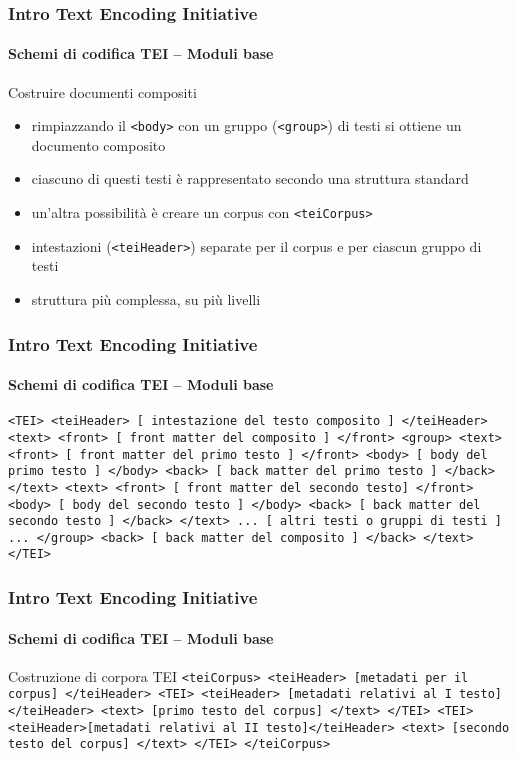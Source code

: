 \begin{frame}
	\frametitle{Intro Text Encoding Initiative}
	\framesubtitle{Schemi di codifica TEI – Moduli base}
	\addtocounter{nframe}{1}
    \begin{block}{Costruire documenti compositi}
        \begin{itemize}
            \item rimpiazzando il \texttt{<body>} con un gruppo (\texttt{<group>}) di testi si ottiene un documento composito
            \item ciascuno di questi testi è rappresentato secondo una struttura
            standard
            \item un’altra possibilità è creare un corpus con \texttt{<teiCorpus>}
            \item intestazioni (\texttt{<teiHeader>}) separate per il corpus e per
            ciascun gruppo di testi
            \item struttura più complessa, su più livelli
        \end{itemize}
    \end{block}
\end{frame}


\begin{frame}
	\frametitle{Intro Text Encoding Initiative}
	\framesubtitle{Schemi di codifica TEI – Moduli base}
	\addtocounter{nframe}{1}

        \texttt{<TEI>
        <teiHeader> [ intestazione del testo composito ] </teiHeader>
        <text>
        <front> [ front matter del composito ] </front>
        <group>
        <text>
        <front> [ front matter del primo testo ] </front>
        <body> [ body del primo testo ]
        </body>
        <back> [ back matter del primo testo ] </back>
        </text>
        <text>
        <front> [ front matter del secondo testo] </front>
        <body> [ body del secondo testo ]
        </body>
        <back> [ back matter del secondo testo ] </back>
        </text>
        ...
        [ altri testi o gruppi di testi ]
        ...
        </group>
        <back>
        [ back matter del composito ]
        </back>
        </text>
        </TEI>}

\end{frame}

\begin{frame}
	\frametitle{Intro Text Encoding Initiative}
	\framesubtitle{Schemi di codifica TEI – Moduli base}
	\addtocounter{nframe}{1}

    \begin{block}{Costruzione di corpora TEI}
        \texttt{<teiCorpus>
<teiHeader> [metadati per il corpus] </teiHeader>
<TEI>
<teiHeader> [metadati relativi al I testo]</teiHeader>
<text> [primo testo del corpus] </text>
</TEI>
<TEI>
<teiHeader>[metadati relativi al II testo]</teiHeader>
<text> [secondo testo del corpus] </text>
</TEI>
</teiCorpus>}
    \end{block}
\end{frame}


